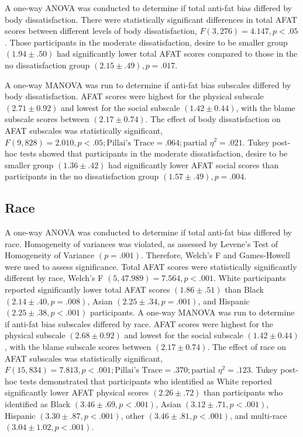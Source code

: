 \documentclass[
  jou,
  longtable,
  nolmodern,
  notxfonts,
  notimes,
  colorlinks=true,linkcolor=blue,citecolor=blue,urlcolor=blue]{apa7}
\begin{document}
A one-way ANOVA was conducted to determine if total anti-fat bias
differed by body dissatisfaction. There were statistically significant
differences in total AFAT scores between different levels of body
dissatisfaction, \(F(3, 276) = 4.147, p < .05\). Those participants in
the moderate dissatisfaction, desire to be smaller group
\((1.94 \pm .50)\) had significantly lower total AFAT scores compared to
those in the no dissatisfaction group \((2.15 \pm .49), p = .017\).

A one-way MANOVA was run to determine if anti-fat bias subscales
differed by body dissatisfaction. AFAT scores were highest for the
physical subscale \((2.71 \pm 0.92)\) and lowest for the social subscale
\((1.42 \pm 0.44)\), with the blame subscale scores between
\((2.17 \pm 0.74)\). The effect of body dissatisfaction on AFAT
subscales was statistically significant,
\(F(9,828) = 2.010, p < .05; \text{Pillai’s Trace} = .064; \text{partial } \eta^2 = .021\).
Tukey post-hoc tests showed that participants in the moderate
dissatisfaction, desire to be smaller group \((1.36 \pm .42)\) had
significantly lower AFAT social scores than participants in the no
dissatisfaction group \((1.57 \pm .49), p = .004\).

\subsection{Race}\label{race}

A one-way ANOVA was conducted to determine if total anti-fat bias
differed by race. Homogeneity of variances was violated, as assessed by
Levene's Test of Homogeneity of Variance \((p = .001)\). Therefore,
Welch's F and Games-Howell were used to assess significance. Total AFAT
scores were statistically significantly different by race, Welch's F
\((5,47.989) = 7.564, p < .001\). White participants reported
significantly lower total AFAT scores \((1.86 \pm .51)\) than Black
\((2.14 \pm .40, p = .008)\), Asian \((2.25 \pm .34, p = .001)\), and
Hispanic \((2.25 \pm .38, p <.001)\) participants. A one-way MANOVA was
run to determine if anti-fat bias subscales differed by race. AFAT
scores were highest for the physical subscale \((2.68 \pm 0.92)\) and
lowest for the social subscale \((1.42 \pm 0.44)\), with the blame
subscale scores between \((2.17 \pm 0.74)\). The effect of race on AFAT
subscales was statistically significant,
\(F(15,834) = 7.813, p < .001; \text{Pillai’s Trace} = .370; \text{partial } \eta^2 = .123\).
Tukey post-hoc tests demonstrated that participants who identified as
White reported significantly lower AFAT physical scores
\((2.26 \pm .72)\) than participants who identified as Black
\((3.46 \pm .69, p<.001)\), Asian \((3.12 \pm .71, p<.001)\), Hispanic
\((3.30 \pm .87, p<.001)\), other \((3.46 \pm .81, p<.001)\), and
multi-race \((3.04 \pm 1.02, p<.001)\).
\end{document}
